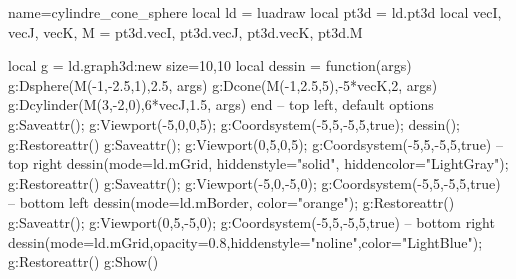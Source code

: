 \begin{luadraw}{name=cylindre_cone_sphere}
local ld = luadraw
local pt3d = ld.pt3d
local vecI, vecJ, vecK, M = pt3d.vecI, pt3d.vecJ, pt3d.vecK, pt3d.M

local g = ld.graph3d:new{ size={10,10} }
local dessin = function(args)
    g:Dsphere(M(-1,-2.5,1),2.5, args)
    g:Dcone(M(-1,2.5,5),-5*vecK,2, args)
    g:Dcylinder(M(3,-2,0),6*vecJ,1.5, args)
end
-- top left, default options
g:Saveattr(); g:Viewport(-5,0,0,5); g:Coordsystem(-5,5,-5,5,true); dessin(); g:Restoreattr()
g:Saveattr(); g:Viewport(0,5,0,5); g:Coordsystem(-5,5,-5,5,true) 
-- top right
dessin({mode=ld.mGrid, hiddenstyle="solid", hiddencolor="LightGray"}); g:Restoreattr()
g:Saveattr(); g:Viewport(-5,0,-5,0); g:Coordsystem(-5,5,-5,5,true) 
-- bottom left
dessin({mode=ld.mBorder, color="orange"}); g:Restoreattr()
g:Saveattr(); g:Viewport(0,5,-5,0); g:Coordsystem(-5,5,-5,5,true) 
-- bottom right
dessin({mode=ld.mGrid,opacity=0.8,hiddenstyle="noline",color="LightBlue"}); g:Restoreattr()
g:Show()
\end{luadraw}
